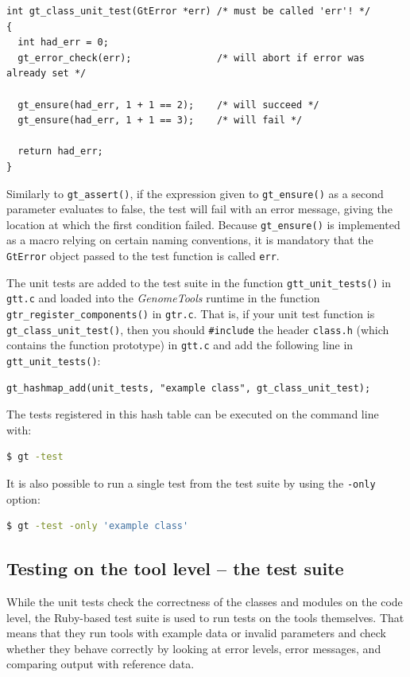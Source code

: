 \documentclass[11pt,final]{article}
\newcommand{\keyword}[1]{\lstinline{#1}}
\newcommand{\Gt}[0]{\emph{GenomeTools}\xspace}
\begin{document}
\begin{lstlisting}
int gt_class_unit_test(GtError *err) /* must be called 'err'! */
{
  int had_err = 0;
  gt_error_check(err);               /* will abort if error was already set */

  gt_ensure(had_err, 1 + 1 == 2);    /* will succeed */
  gt_ensure(had_err, 1 + 1 == 3);    /* will fail */

  return had_err;
}
\end{lstlisting}

Similarly to \keyword{gt_assert()}, if the expression given to
\keyword{gt_ensure()} as a second parameter evaluates to false, the test will
fail with an error message, giving the location at which the first condition
failed. Because \keyword{gt_ensure()} is implemented as a macro relying on
certain naming conventions, it is mandatory that the \keyword{GtError} object
passed to the test function is called \keyword{err}.

The unit tests are added to the test suite in the function
\keyword{gtt_unit_tests()} in \keyword{gtt.c} and loaded into the \Gt runtime
in the function \keyword{gtr_register_components()} in \keyword{gtr.c}.
That is, if your unit test function is \keyword{gt_class_unit_test()}, then you
should \keyword{#include} the header \keyword{class.h} (which contains the
function prototype) in \keyword{gtt.c} and add the following line in
\keyword{gtt_unit_tests()}:
\begin{lstlisting}
gt_hashmap_add(unit_tests, "example class", gt_class_unit_test);
\end{lstlisting}

The tests registered in this hash table can be executed on the command line
with:

\begin{lstlisting}[language=sh]
$ gt -test
\end{lstlisting}%

It is also possible to run a single test from the test suite by using the
\keyword{-only} option:

\begin{lstlisting}[language=sh]
$ gt -test -only 'example class'
\end{lstlisting}%

\subsection{Testing on the tool level -- the test suite}

While the unit tests check the correctness of the classes and modules on the
code level, the Ruby-based test suite is used to run tests on the tools
themselves. That means that they run tools with example data or invalid
parameters and check whether they behave correctly by looking at error levels,
error messages, and comparing output with reference data.
\end{document}
